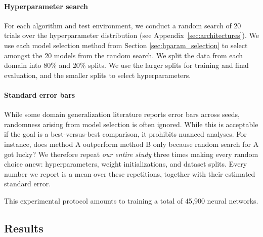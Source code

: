\documentclass{article}
\begin{document}
\paragraph{Hyperparameter search}
For each algorithm and test environment, we conduct a random search \citep{bergstra2012random} of 20 trials over the hyperparameter distribution (see Appendix~\ref{sec:architectures}).
%
We use each model selection method from Section \ref{sec:hparam_selection} to select amongst the 20 models from the random search.
%
We split the data from each domain into 80\% and 20\% splits.
%
We use the larger splits for training and final evaluation, and the smaller splits to select hyperparameters.

\paragraph{Standard error bars}
While some domain generalization literature reports error bars across seeds, randomness arising from model selection is often ignored.
%
While this is acceptable if the goal is a best-versus-best comparison, it prohibits nuanced analyses.
%
For instance, does method A outperform method B only because random search for A got lucky?
%
We therefore repeat \textit{our entire study} three times making every random choice anew: hyperparameters, weight initializations, and dataset splits.
%
Every number we report is a mean over these repetitions, together with their estimated standard error.

This experimental protocol amounts to training a total of 45,900 neural networks.

\subsection{Results}
\end{document}
